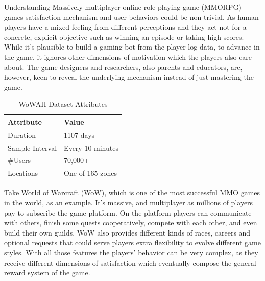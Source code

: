 \documentclass{sigchi}
\begin{document}
Understanding Massively multiplayer online role-playing game (MMORPG) games satisfaction mechanism and user behaviors could be non-trivial.
As human players have a mixed feeling from different perceptions and they act not for a concrete, explicit objective such as winning an episode or taking high scores.
While it's plausible to build a gaming bot from the player log data, to advance in the game, it ignores other dimensions of motivation which the players also care about.
The game designers and researchers, also parents and educators, are, however, keen to reveal the underlying mechanism instead of just mastering the game.

\begin{table}[t]
    \centering
    \caption{WoWAH Dataset Attributes}
    \begin{tabularx}{\textwidth}{lX}
        Attribute & Value \\
        \midrule
        Duration & 1107 days \\
        Sample Interval & Every 10 minutes \\
        \#Users & 70,000+ \\
        Locations & One of 165 zones
        \label{tbl:wowah}
    \end{tabularx}
\end{table}

Take World of Warcraft (WoW), which is one of the most successful MMO games in the world, as an example.
It's massive, and multiplayer as millions of players pay to subscribe the game platform.
On the platform players can communicate with others, finish some quests cooperatively, compete with each other, and even build their own guilds.
WoW also provides different kinds of races, careers and optional requests that could serve players extra flexibility to evolve different game styles.
With all those features the players' behavior can be very complex, as they receive different dimensions of satisfaction which eventually compose the general reward system of the game.
\end{document}
